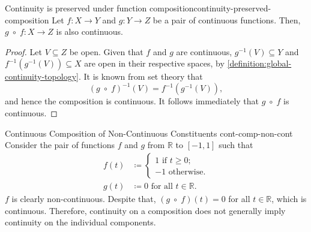 \documentclass{article}
\DeclareMathOperator\fcomp{\,\circ\,}
\numberwithin{equation}{section}
\numberwithin{figure}{section}
\begin{document}
\begin{theorem}{Continuity is preserved under function
        composition}{continuity-preserved-composition}
    Let $ f \colon X \to Y $ and $ g \colon Y \to Z $ be a pair of continuous
    functions. Then, $ g \fcomp f \colon X \to Z $ is also continuous.
    \begin{proof}
        Let $ V \subseteq Z $ be open. Given that $ f $ and $ g $ are
        continuous, $ g^{-1}(V) \subseteq Y $ and $ f^{-1}\left(g^{-1}(V)\right)
        \subseteq X $ are open in their respective spaces, by
        \cref{definition:global-continuity-topology}. It is known from set
        theory that
        \begin{equation}
            \left(g \fcomp f \right)^{-1}(V) = f^{-1}\left(g^{-1}(V)\right),
        \end{equation}
        and hence the composition is continuous. It follows immediately that $ g
        \fcomp f $ is continuous.
    \end{proof}
\end{theorem}
\begin{example}{Continuous Composition of Non-Continuous Constituents}
        {cont-comp-non-cont}
    Consider the pair of functions $ f $ and $ g $ from $ \mathbb{R} $ to $ [-1,
    1] $ such that
    \begin{align}
        f(t) &\coloneq \begin{cases}
            1 \text{ if } t \geq 0; \\
            -1 \text{ otherwise.}
        \end{cases} \\
        g(t) &\coloneq 0 \text{ for all } t \in \mathbb{R}.
    \end{align}
    $ f $ is clearly non-continuous. Despite that, $ (g \fcomp f)(t) = 0 $ for
    all $ t \in \mathbb{R} $, which is continuous. Therefore, continuity on a
    composition does not generally imply continuity on the individual
    components.
\end{example}
\end{document}

